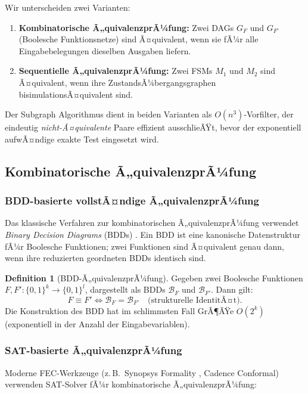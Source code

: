 ﻿\documentclass[a4paper,12pt]{article}
\theoremstyle{definition}
\newtheorem{definition}{Definition}
\begin{document}
Wir unterscheiden zwei Varianten:
\begin{enumerate}
  \item \textbf{Kombinatorische Ã„quivalenzprÃ¼fung:} Zwei DAGs $G_F$ und $G_{F'}$
        (Boolesche Funktionsnetze) sind Ã¤quivalent, wenn sie fÃ¼r alle
        Eingabebelegungen dieselben Ausgaben liefern.
  \item \textbf{Sequentielle Ã„quivalenzprÃ¼fung:} Zwei FSMs $M_1$ und $M_2$ sind
        Ã¤quivalent, wenn ihre ZustandsÃ¼bergangsgraphen bisimulationsÃ¤quivalent sind.
\end{enumerate}

Der Subgraph Algorithmus dient in beiden Varianten als $O(n^3)$-Vorfilter, der
eindeutig \emph{nicht-Ã¤quivalente} Paare effizient ausschlieÃŸt, bevor der exponentiell
aufwÃ¤ndige exakte Test eingesetzt wird.

\subsection{Kombinatorische Ã„quivalenzprÃ¼fung}

\subsubsection{BDD-basierte vollstÃ¤ndige Ã„quivalenzprÃ¼fung}

Das klassische Verfahren zur kombinatorischen Ã„quivalenzprÃ¼fung verwendet
\emph{Binary Decision Diagrams} (BDDs) \cite{mcmillan1993symbolic}. Ein BDD ist eine
kanonische Datenstruktur fÃ¼r Boolesche Funktionen; zwei Funktionen sind Ã¤quivalent
genau dann, wenn ihre reduzierten geordneten BDDs identisch sind.

\begin{definition}[BDD-Ã„quivalenzprÃ¼fung]\label{def:bddequiv}
  Gegeben zwei Boolesche Funktionen $F, F': \{0,1\}^k \to \{0,1\}^l$, dargestellt als
  BDDs $\mathcal{B}_F$ und $\mathcal{B}_{F'}$. Dann gilt:
  \[
    F \equiv F' \iff \mathcal{B}_F = \mathcal{B}_{F'} \quad \text{(strukturelle IdentitÃ¤t).}
  \]
  Die Konstruktion des BDD hat im schlimmsten Fall GrÃ¶ÃŸe $O(2^k)$ (exponentiell in der
  Anzahl der Eingabevariablen).
\end{definition}

\subsubsection{SAT-basierte Ã„quivalenzprÃ¼fung}

Moderne FEC-Werkzeuge (z.\,B.\ Synopsys Formality \cite{synopsys_dc}, Cadence Conformal)
verwenden SAT-Solver fÃ¼r kombinatorische Ã„quivalenzprÃ¼fung:
\end{document}
